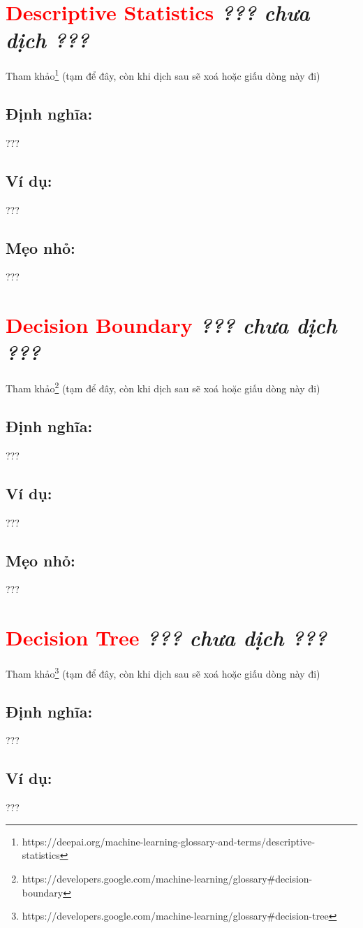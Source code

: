 \section*{\huge \textcolor{Red}{Descriptive Statistics}  \small \textit{??? chưa dịch ???} }
Tham khảo\footnote{https://deepai.org/machine-learning-glossary-and-terms/descriptive-statistics} (tạm để đây, còn khi dịch sau sẽ xoá hoặc giấu dòng này đi)
\subsection*{Định nghĩa:}
???
\subsection*{Ví dụ:}
???
\subsection*{Mẹo nhỏ:}
???
\section*{\huge \textcolor{Red}{Decision Boundary}  \small \textit{??? chưa dịch ???} }
Tham khảo\footnote{https://developers.google.com/machine-learning/glossary\#decision-boundary} (tạm để đây, còn khi dịch sau sẽ xoá hoặc giấu dòng này đi)
\subsection*{Định nghĩa:}
???
\subsection*{Ví dụ:}
???
\subsection*{Mẹo nhỏ:}
???
\section*{\huge \textcolor{Red}{Decision Tree}  \small \textit{??? chưa dịch ???} }
Tham khảo\footnote{https://developers.google.com/machine-learning/glossary\#decision-tree} (tạm để đây, còn khi dịch sau sẽ xoá hoặc giấu dòng này đi)
\subsection*{Định nghĩa:}
???
\subsection*{Ví dụ:}
???
